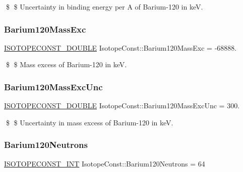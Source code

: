 \$ \$ Uncertainty in binding energy per A of Barium-\/120 in keV. \mbox{\label{group___isotope_const-_barium-_ba120_ga4bf2a0e0abc10dd72c211fe21d9091da}} 
\subsubsection{\texorpdfstring{Barium120\+Mass\+Exc}{Barium120MassExc}}
{\footnotesize\ttfamily \mbox{\hyperlink{group___isotope_const-_macros_ga8f45a7272ce02c0b4c65c44636ed719a}{I\+S\+O\+T\+O\+P\+E\+C\+O\+N\+S\+T\+\_\+\+D\+O\+U\+B\+LE}} Isotope\+Const\+::\+Barium120\+Mass\+Exc = -\/68888.}

\$ \$ Mass excess of Barium-\/120 in keV. \mbox{\label{group___isotope_const-_barium-_ba120_ga752e8ac832e0dad01a62065642a743b4}} 
\subsubsection{\texorpdfstring{Barium120\+Mass\+Exc\+Unc}{Barium120MassExcUnc}}
{\footnotesize\ttfamily \mbox{\hyperlink{group___isotope_const-_macros_ga8f45a7272ce02c0b4c65c44636ed719a}{I\+S\+O\+T\+O\+P\+E\+C\+O\+N\+S\+T\+\_\+\+D\+O\+U\+B\+LE}} Isotope\+Const\+::\+Barium120\+Mass\+Exc\+Unc = 300.}

\$ \$ Uncertainty in mass excess of Barium-\/120 in keV. \mbox{\label{group___isotope_const-_barium-_ba120_gabcd5d8f2783936653abdbf0e3ded9b29}} 
\subsubsection{\texorpdfstring{Barium120\+Neutrons}{Barium120Neutrons}}
{\footnotesize\ttfamily \mbox{\hyperlink{group___isotope_const-_macros_ga5f18360b3e99483a35c32d789e62621c}{I\+S\+O\+T\+O\+P\+E\+C\+O\+N\+S\+T\+\_\+\+I\+NT}} Isotope\+Const\+::\+Barium120\+Neutrons = 64}

